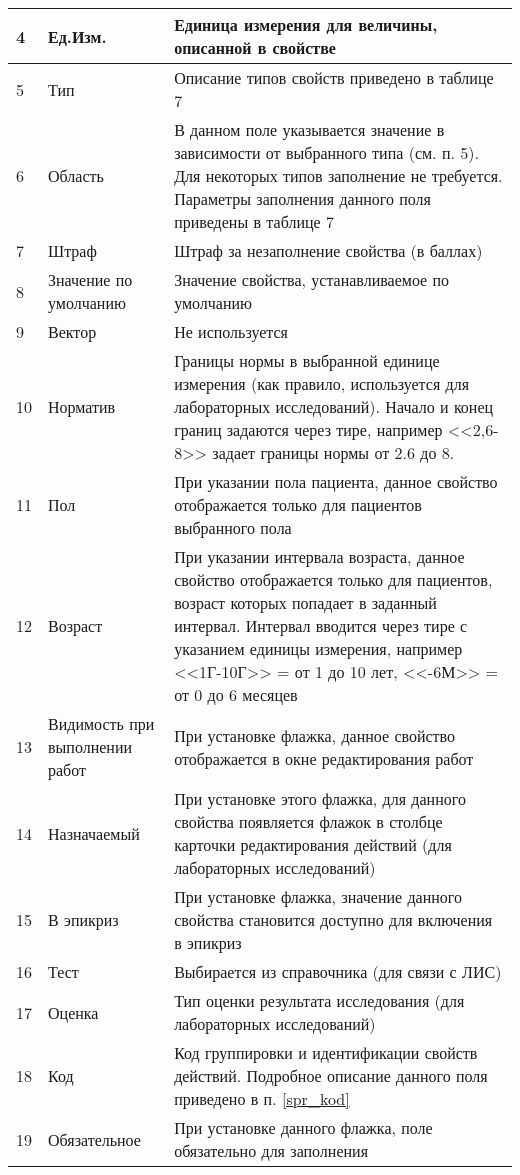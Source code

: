 {\begin{longtable}{|p{0.55cm}|p{4cm}|p{12cm}|}
4	& Ед.Изм. &	Единица измерения для величины, описанной в свойстве \\ \hline
5	& Тип	& Описание типов свойств приведено в таблице 7 \\ \hline
6	& Область & В данном поле указывается значение в зависимости от выбранного типа (см. п. 5). Для некоторых типов заполнение не требуется. Параметры заполнения данного поля приведены в таблице 7 \\ \hline
7	& Штраф	& Штраф за незаполнение свойства (в баллах) \\ \hline
8	& Значение по умолчанию	& Значение свойства, устанавливаемое по умолчанию \\ \hline
9	& Вектор	& Не используется \\ \hline
10	& Норматив	& Границы нормы в выбранной единице измерения (как правило, используется для лабораторных исследований). Начало и конец границ задаются через тире, например <<2,6-8>> задает границы нормы от 2.6 до 8.  \\ \hline
11	& Пол	& При указании пола пациента, данное свойство отображается только для пациентов выбранного пола \\ \hline
12	& Возраст	& При указании интервала возраста, данное свойство отображается только для пациентов, возраст которых попадает в заданный интервал. Интервал вводится через тире с указанием единицы измерения, например <<1Г-10Г>> = от 1 до 10 лет, <<-6М>> = от 0 до 6 месяцев \\ \hline
13	& Видимость при выполнении работ	& При установке флажка, данное свойство отображается в окне редактирования работ \\ \hline
14	& Назначаемый	& При установке этого флажка, для данного свойства появляется флажок в столбце \dm{Назначено} карточки редактирования действий (для лабораторных исследований)  \\ \hline
15	& В эпикриз	& При установке флажка, значение данного свойства становится доступно для включения в эпикриз \\ \hline
16	& Тест	& Выбирается из справочника \mm{Справочники \str Лаборатория \str Показатели исследований} (для связи с ЛИС) \\ \hline
17	& Оценка	& Тип оценки результата исследования (для лабораторных исследований) \\ \hline
18	& Код	& Код группировки и идентификации свойств действий. Подробное описание данного поля приведено в п. \ref{spr_kod}  \\ \hline
19	& Обязательное	& При установке данного флажка, поле обязательно для заполнения \\ \hline

\end{longtable}}
